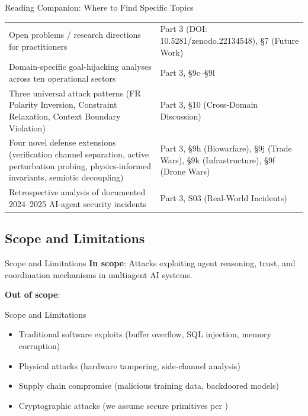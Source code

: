 \documentclass[
  ignorenonframetext,
]{beamer}
\providecommand{\cref}[1]{\texttt{\detokenize{#1}}}
\begin{document}
\begin{frame}[allowframebreaks]{Reading Companion: Where to Find
Specific Topics}
\begin{table}[htbp]
\begin{tabular}{@{}p{}p{}@{}}
Open problems / research directions for practitioners & Part 3 (DOI: 10.5281/zenodo.22134548), \S{7} (Future Work) \\
Domain-specific goal-hijacking analyses across ten operational sectors & Part 3, \S{9c}--\S{9l} \\
Three universal attack patterns (FR Polarity Inversion, Constraint Relaxation, Context Boundary Violation) & Part 3, \S{10} (Cross-Domain Discussion) \\
Four novel defense extensions (verification channel separation, active perturbation probing, physics-informed invariants, semiotic decoupling) & Part 3, \S{9h} (Biowarfare), \S{9j} (Trade Wars), \S{9k} (Infrastructure), \S{9f} (Drone Wars) \\
Retrospective analysis of documented 2024--2025 AI-agent security incidents & Part 3, S03 (Real-World Incidents) \\
\bottomrule
\end{tabular}
\end{table}
\end{frame}

\subsection{Scope and Limitations}\label{sec:scope}

\begin{frame}[allowframebreaks]{Scope and Limitations}
\textbf{In scope}: Attacks exploiting agent reasoning, trust, and
coordination mechanisms in multiagent AI systems.

\textbf{Out of scope}:

\end{frame}

\begin{frame}[allowframebreaks]{Scope and Limitations}
\begin{itemize}
\item Traditional software exploits (buffer overflow, SQL injection, memory corruption)
\item Physical attacks (hardware tampering, side-channel analysis)
\item Supply chain compromise (malicious training data, backdoored models)
\item Cryptographic attacks (we assume secure primitives per \cref{ax:crypto-limit})
\end{itemize}

\end{frame}
\end{document}
